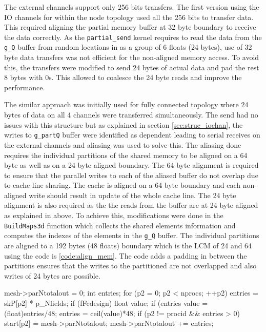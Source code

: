The external channels support only 256 bits transfers. The first version
using the IO channels for within the node topology used all the 256 bits
to transfer data. This required aligning the partial memory buffer
at 32 byte boundary to receive the data correctly. As the \texttt{partial\_send}
kernel requires to read the data from the \texttt{g\_Q} buffer from random
locations in as a group of 6 floats (24 bytes), use of 32 byte data transfers
was not efficient for the non-aligned memory access. To avoid this, the transfers
were modified to send 24 bytes of actual data and pad the rest 8 bytes with 0s.
This allowed to coalesce the 24 byte reads and improve the performance.

The similar approach was initially used for fully connected topology where
24 bytes of data on all 4 channels were transferred simultaneously. The send had
no issues with this structure but as explained in section \ref{sec:struc_iochan},
the writes to \texttt{g\_partQ} buffer were identified as dependent leading
to serial receives on the external channels and aliasing was used to solve this.
The aliasing done requires the individual partitions of the shared memory to be aligned
on a 64 byte as well as on a 24 byte aligned boundary. The 64 byte alignment is required
to ensure that the parallel writes to each of the aliased buffer do not overlap due to
cache line sharing. The cache is aligned on a 64 byte boundary and each non-aligned
write should result in update of the whole cache line. The 24 byte alignment is also
required as the the reads from the buffer are at 24 byte aligned as explained in above.
To achieve this, modifications
were done in the \texttt{BuildMaps3d} function which collects the shared elements information
and computes the indexes of the elements in the \texttt{g\_Q} buffer. The individual partitions
are aligned to a 192 bytes (48 floats) boundary which is the \ac{LCM} of 24 and 64 using the code
is \ref{code:align_mem}. The code adds a padding in between the partitions ensures
that the writes to the partitioned are not overlapped and also writes of 24 bytes are
possible.

\begin{CppCode}[caption=Alignment code introduced to ensure non-overlap writes of the
    aliased buffers, frame=tlrb, label=code:align_mem, float]
mesh->parNtotalout = 0;
int entries;
for (p2 = 0; p2 < nprocs; ++p2)
{
    entries = skP[p2] * p_Nfields;
    if (fFcdesign)
    {
        float value;
        if (entries%
        {
            value = (float)entries/48;
            entries = ceil(value)*48;
        }
        if (p2 != procid && entries > 0)
            start[p2] = mesh->parNtotalout;
    }
    mesh->parNtotalout += entries;
}
\end{CppCode}

